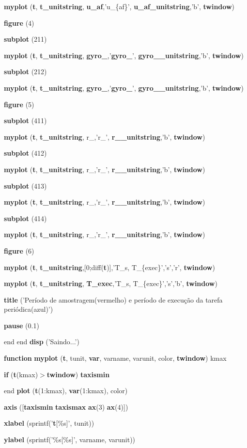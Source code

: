 \begin{DoxyCompactItemize}
\item 
{\bf myplot} ({\bf t}, {\bf t\_\-unitstring}, {\bf u\_\-af},'u\_\-\{af\}', {\bf u\_\-af\_\-unitstring},'b', {\bf twindow})
\item 
{\bf figure} (4)
\item 
{\bf subplot} (211)
\item 
{\bf myplot} ({\bf t}, {\bf t\_\-unitstring}, {\bf gyro\_},'{\bf gyro\_}', {\bf gyro\_\_\-unitstring},'b', {\bf twindow})
\item 
{\bf subplot} (212)
\item 
{\bf myplot} ({\bf t}, {\bf t\_\-unitstring}, {\bf gyro\_},'{\bf gyro\_}', {\bf gyro\_\_\-unitstring},'b', {\bf twindow})
\item 
{\bf figure} (5)
\item 
{\bf subplot} (411)
\item 
{\bf myplot} ({\bf t}, {\bf t\_\-unitstring}, r\_,'r\_', {\bf r\_\_\-unitstring},'b', {\bf twindow})
\item 
{\bf subplot} (412)
\item 
{\bf myplot} ({\bf t}, {\bf t\_\-unitstring}, r\_,'r\_', {\bf r\_\_\-unitstring},'b', {\bf twindow})
\item 
{\bf subplot} (413)
\item 
{\bf myplot} ({\bf t}, {\bf t\_\-unitstring}, r\_,'r\_', {\bf r\_\_\-unitstring},'b', {\bf twindow})
\item 
{\bf subplot} (414)
\item 
{\bf myplot} ({\bf t}, {\bf t\_\-unitstring}, r\_,'r\_', {\bf r\_\_\-unitstring},'b', {\bf twindow})
\item 
{\bf figure} (6)
\item 
{\bf myplot} ({\bf t}, {\bf t\_\-unitstring},[0;diff({\bf t})],'T\_\-s, T\_\-\{exec\}','s','r', {\bf twindow})
\item 
{\bf myplot} ({\bf t}, {\bf t\_\-unitstring}, {\bf T\_\-exec},'T\_\-s, T\_\-\{exec\}','s','b', {\bf twindow})
\item 
{\bf title} ('Período de amostragem(vermelho) e período de execução da tarefa periódica(azul)')
\item 
{\bf pause} (0.1)
\item 
end end {\bf disp} ('Saindo...')
\item 
{\bf function} {\bf myplot} ({\bf t}, tunit, {\bf var}, varname, varunit, color, {\bf twindow}) kmax
\item 
{\bf if} ({\bf t}(kmax)$>${\bf twindow}) {\bf taxismin}
\item 
end {\bf plot} ({\bf t}(1:kmax), {\bf var}(1:kmax), color)
\item 
{\bf axis} ([{\bf taxismin} {\bf taxismax} {\bf ax}(3) {\bf ax}(4)])
\item 
{\bf xlabel} (sprintf('{\bf t}[\%s]', tunit))
\item 
{\bf ylabel} (sprintf('\%s[\%s]', varname, varunit))
\end{DoxyCompactItemize}
